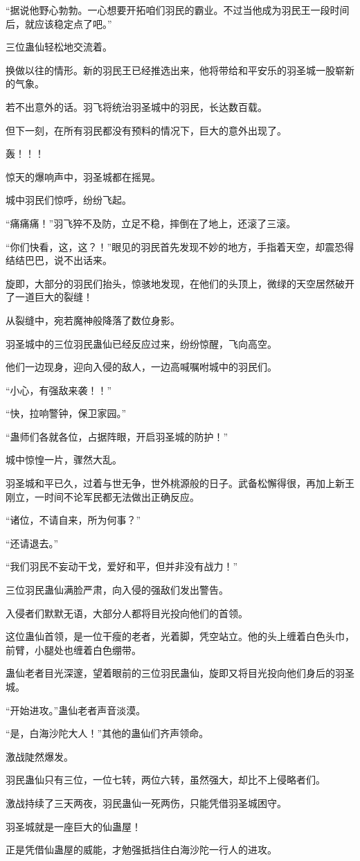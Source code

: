 \begin{this_body}
“据说他野心勃勃。一心想要开拓咱们羽民的霸业。不过当他成为羽民王一段时间后，就应该稳定点了吧。”

三位蛊仙轻松地交流着。

换做以往的情形。新的羽民王已经推选出来，他将带给和平安乐的羽圣城一股崭新的气象。

若不出意外的话。羽飞将统治羽圣城中的羽民，长达数百载。

但下一刻，在所有羽民都没有预料的情况下，巨大的意外出现了。

轰！！！

惊天的爆响声中，羽圣城都在摇晃。

城中羽民们惊呼，纷纷飞起。

“痛痛痛！”羽飞猝不及防，立足不稳，摔倒在了地上，还滚了三滚。

“你们快看，这，这？！”眼见的羽民首先发现不妙的地方，手指着天空，却震恐得结结巴巴，说不出话来。

旋即，大部分的羽民们抬头，惊骇地发现，在他们的头顶上，微绿的天空居然破开了一道巨大的裂缝！

从裂缝中，宛若魔神般降落了数位身影。

羽圣城中的三位羽民蛊仙已经反应过来，纷纷惊醒，飞向高空。

他们一边现身，迎向入侵的敌人，一边高喊嘱咐城中的羽民们。

“小心，有强敌来袭！！”

“快，拉响警钟，保卫家园。”

“蛊师们各就各位，占据阵眼，开启羽圣城的防护！”

城中惊惶一片，骤然大乱。

羽圣城和平已久，过着与世无争，世外桃源般的日子。武备松懈得很，再加上新王刚立，一时间不论军民都无法做出正确反应。

“诸位，不请自来，所为何事？”

“还请退去。”

“我们羽民不妄动干戈，爱好和平，但并非没有战力！”

三位羽民蛊仙满脸严肃，向入侵的强敌们发出警告。

入侵者们默默无语，大部分人都将目光投向他们的首领。

这位蛊仙首领，是一位干瘦的老者，光着脚，凭空站立。他的头上缠着白色头巾，前臂，小腿处也缠着白色绷带。

蛊仙老者目光深邃，望着眼前的三位羽民蛊仙，旋即又将目光投向他们身后的羽圣城。

“开始进攻。”蛊仙老者声音淡漠。

“是，白海沙陀大人！”其他的蛊仙们齐声领命。

激战陡然爆发。

羽民蛊仙只有三位，一位七转，两位六转，虽然强大，却比不上侵略者们。

激战持续了三天两夜，羽民蛊仙一死两伤，只能凭借羽圣城困守。

羽圣城就是一座巨大的仙蛊屋！

正是凭借仙蛊屋的威能，才勉强抵挡住白海沙陀一行人的进攻。

\end{this_body}


